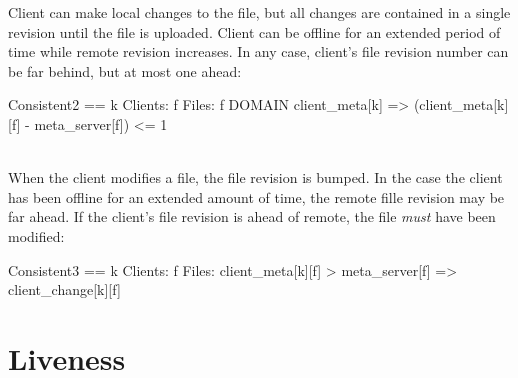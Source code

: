 Client can make local changes to the file, but all changes are contained in a
single revision until the file is uploaded. Client can be offline for an
extended period of time while remote revision increases. In any case, client's
file revision number can be far behind, but at most one ahead:\\

\begin{tla}
Consistent2 == 
    \A k \in Clients:
        \A f \in Files:
            f \in DOMAIN client_meta[k] 
                => (client_meta[k][f] - meta_server[f]) <= 1
\end{tla}
\begin{tlatex}
%
%
%
%
\end{tlatex}
\\

When the client modifies a file, the file revision is bumped. In the case the 
client has been offline for an extended amount of time, the remote fille revision 
may be far ahead. If the client's file revision is ahead of remote, the file 
\textit{must} have been modified:\\

\begin{tla}
Consistent3 == 
    \A k \in Clients:
        \A f \in Files:
            client_meta[k][f] > meta_server[f] => client_change[k][f]
\end{tla}
\begin{tlatex}
%
%
%
\end{tlatex}

\section{Liveness}

% 

